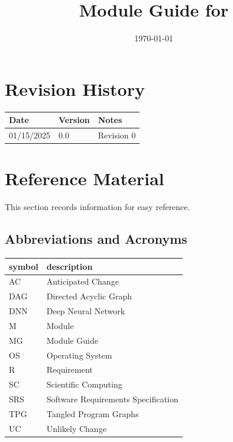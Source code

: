 \documentclass[12pt, titlepage]{article}
\begin{document}
\title{Module Guide for \progname{}} 
\author{\authname}
\date{\today}

\maketitle


\section{Revision History}

\begin{tabularx}{\textwidth}{p{3cm}p{2cm}X}
\toprule {\bf Date} & {\bf Version} & {\bf Notes}\\
\midrule
01/15/2025 & 0.0 & Revision 0\\
\bottomrule
\end{tabularx}

\newpage

\section{Reference Material}

This section records information for easy reference.

\subsection{Abbreviations and Acronyms}

\renewcommand{\arraystretch}{1.2}
\begin{tabular}{l l} 
  \toprule		
  \textbf{symbol} & \textbf{description}\\
  \midrule 
  AC & Anticipated Change\\
  DAG & Directed Acyclic Graph \\
  DNN & Deep Neural Network \\
  M & Module \\
  MG & Module Guide \\
  OS & Operating System \\
  R & Requirement\\
  SC & Scientific Computing \\
  SRS & Software Requirements Specification\\
  TPG & Tangled Program Graphs\\
  UC & Unlikely Change \\
  \bottomrule
\end{tabular}\\
\end{document}
